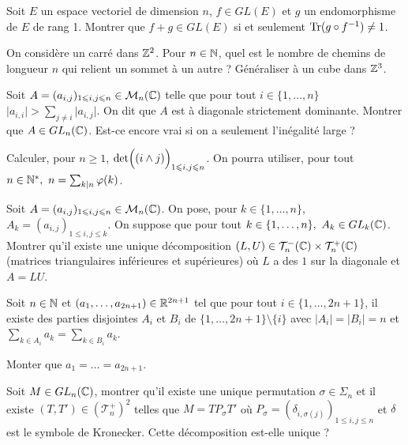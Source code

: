 \documentclass[12pt]{article}
\begin{document}
\begin{exercise}
	Soit $E$ un espace vectoriel de dimension $n$, $f\in GL(E)$ et $g$ un
	endomorphisme de $E$ de rang 1. Montrer que $f+g\in GL(E)$ si et seulement
	$\operatorname{Tr}(g\circ f^{-1})\neq 1$.
\end{exercise}

\begin{exercise}
	On considère un carré dans $\mathbb{Z}^{2}$. Pour $n\in\mathbb{N}$, quel est le nombre de
	chemins de longueur $n$ qui relient un sommet à un autre ? Généraliser à un
	cube dans $\mathbb{Z}^{3}$.
\end{exercise}

\begin{exercise}
	Soit $A=(a_{i,j})_{1\leqslant i,j\leqslant n}\in\mathcal{M}_{n}(\mathbb{C})$ telle que pour
	tout $i\in\{1,\dots,n\}$$\vert a_{i,i}\vert>\sum_{j\neq i}\vert a_{i,j}\vert$.
	On dit que $A$ est à diagonale strictement dominante. Montrer que $A\in
	GL_{n}(\mathbb{C})$. Est-ce encore vrai si on a seulement l'inégalité large ?
\end{exercise}

\begin{exercise}
	Calculer, pour $n\geqslant1$, $\det\Bigl((i\wedge j)\Bigr)_{1\leqslant
	i,j\leqslant n}$. On pourra utiliser, pour tout $n\in\mathbb{N}^{*},~n=\sum_{k\mid
	n}\varphi(k)$.
\end{exercise}

\begin{exercise}
	Soit $A=(a_{i,j})_{1\leqslant i,j\leqslant n}\in\mathcal{M}_{n}(\mathbb{C})$. On pose, pour
	$k\in\{1,\dots, n\}$,$A_{k}=(a_{i,j})_{1\leqslant i,j\leqslant k}$. On suppose
	que pour tout $k\in\{1,\dots,n\},~A_{k}\in GL_{k}(\mathbb{C})$. Montrer qu'il existe
	une unique décomposition
	$(L,U)\in\mathcal{T}_{n}^{-}(\mathbb{C})\times\mathcal{T}_{n}^{+}(\mathbb{C})$ (matrices
	triangulaires inférieures et supérieures) où $L$ a des $1$ sur la diagonale et
	$A=LU$.
\end{exercise}

\begin{exercise}
	Soit $n\in\mathbb{N}$ et $(a_{1},\dots,a_{2n+1})\in\mathbb{R}^{2n+1}$ tel que pour tout
	$i\in\{1,\dots,2n+1\}$, il existe des parties disjointes $A_{i}$ et $B_{i}$ de
	$\{1,\dots,2n+1\}\setminus\{i\}$ avec $\vert A_{i}\vert=\vert B_{i}\vert=n$ et
	$\sum_{k\in A_{i}}a_{k}=\sum_{k\in B_{i}}a_{k}$.

	Monter que $a_{1}=\dots=a_{2n+1}$.
\end{exercise}

\begin{exercise}
	Soit $M\in GL_{n}(\mathbb{C})$, montrer qu'il existe une unique permutation
	$\sigma\in\Sigma_{n}$ et il existe $(T,T')\in(\mathcal{T}_{n}^{+})^{2}$ telles
	que $M=TP_{\sigma}T'$ où $P_{\sigma}=(\delta_{i,\sigma(j)})_{1\leqslant
	i,j\leqslant n}$ et $\delta$ est le symbole de Kronecker. Cette décomposition
	est-elle unique ?
\end{exercise}
\end{document}
